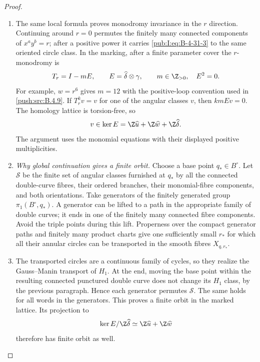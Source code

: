 \begin{proof}
\begin{enumerate}[label=\arabic*.,leftmargin=*]
\item The same local formula proves monodromy invariance in the
$r$ direction. Continuing around $r=0$ permutes the finitely
many connected components of $x^a y^b=r$; after a positive
power it carries \eqref{pub:I:eq:B-4-31-3} to the same oriented circle class.
In the marking, after a finite parameter cover the
$r$-monodromy is
\begin{equation}
 T_r=I-mE,\qquad
 E=\widehat\delta\otimes\gamma,\qquad m\in\Z_{>0},
 \quad E^2=0.
\label{pub:I:eq:B-4-31-4}
\end{equation}
For example, $w=r^6$ gives $m=12$ with the positive-loop
convention used in \ref{push:src:B.4.9}. If $T_r^k v=v$ for one of the
angular classes $v$, then $kmEv=0$. The homology lattice is
torsion-free, so
\begin{equation}
 v\in\ker E
    =\Z\widehat u+\Z\widehat w+\Z\widehat\delta.
\label{pub:I:eq:B-4-31-5}
\end{equation}
The argument uses the monomial equations with their displayed
positive multiplicities.

\item \emph{Why global continuation gives a finite orbit.}
Choose a base point $q_*\in B^\circ$. Let $\mathscr S$ be the
finite set of angular classes furnished at $q_*$ by all the
connected double-curve fibres, their ordered branches, their
monomial-fibre components, and both orientations.
Take generators of the finitely generated group
$\pi_1(B^\circ,q_*)$. A generator can be lifted to a path in
the appropriate family of double curves; it ends in one of
the finitely many connected fibre components. Avoid the
triple points during this lift. Properness over the compact
generator paths and finitely many product charts give one
sufficiently small $r_*$ for which all their annular circles
can be transported in the smooth fibres
$X_{q,r_*}$.

\item The transported circles are a continuous family of cycles,
so they realize the Gauss--Manin transport of $H_1$.
At the end, moving the base point within the resulting
connected punctured double curve does not change its $H_1$
class, by the previous paragraph. Hence each generator
permutes $\mathscr S$. The same holds for all words in the
generators. This proves a finite orbit in the marked lattice.
Its projection to
\begin{equation}
 \ker E/\Z\widehat\delta
       \simeq \Z\widehat u+\Z\widehat w
\label{pub:I:eq:B-4-31-6}
\end{equation}
therefore has finite orbit as well.


\end{enumerate}
\end{proof}
